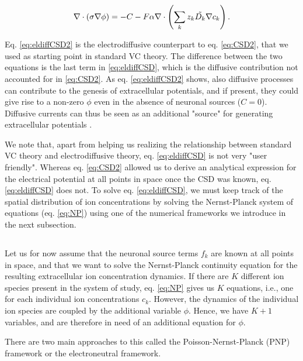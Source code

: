 \begin{equation}
\nabla \cdot (\sigma\nabla\phi) = - C - F\alpha \nabla \cdot \left (\sum_k{z_k \tilde{D_k}{\bf \nabla} c_{k}} \right).
\label{eq:eldiffCSD2}
\end{equation}

Eq. \ref{eq:eldiffCSD2} is the electrodiffusive counterpart to eq. \ref{eq:CSD2}, that we used as starting point in standard VC theory. The difference between the two equations is the last term in \ref{eq:eldiffCSD}, which is the diffusive contribution not accounted for in \ref{eq:CSD2}. As eq. \ref{eq:eldiffCSD2} shows, also diffusive processes can contribute to the genesis of extracellular potentials, and if present, they could give rise to a non-zero $\phi$ even in the absence of neuronal sources ($C = 0$). Diffusive currents can thus be seen as an additional "source" for generating extracellular potentials \cite{Halnes2017}. 

We note that, apart from helping us realizing the relationship between standard VC theory and electrodiffusive theory, eq. \ref{eq:eldiffCSD} is not very "user friendly". Whereas eq. \ref{eq:CSD2} allowed us to derive an analytical expression for the electrical potential at all points in space once the CSD was known, eq. \ref{eq:eldiffCSD} does not. To solve  eq. \ref{eq:eldiffCSD}, we must keep track of the spatial distribution of ion concentrations by solving the Nernst-Planck system of equations (eq. \ref{eq:NP}) using one of the numerical frameworks we introduce in the next subsection.


\subsection{ }
Let us for now assume that the neuronal source terms $f_k$ are known at all points in space, and that we want to solve the Nernst-Planck continuity equation for the resulting extracellular ion concentration dynamics. If there are $K$ different ion species present in the system of study, eq. \ref{eq:NP} gives us $K$ equations, i.e., one for each individual ion concentrations $c_k$. However, the dynamics of the individual ion species are coupled by the additional variable $\phi$. Hence, we have $K+1$ variables, and are therefore in need of an additional equation for $\phi$. 

There are two main approaches to this called the Poisson-Nernst-Planck (PNP) framework or the electroneutral framework.

